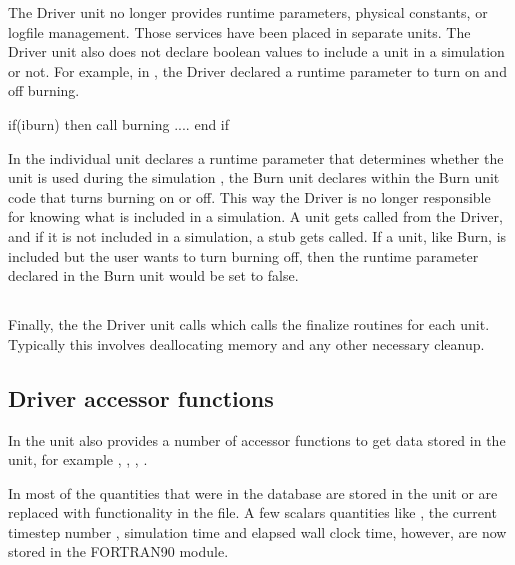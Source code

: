 \begin{flashtip}
The \unit{Driver} unit no longer provides runtime parameters,
physical constants, or logfile management.  Those services have been
placed in separate units.  The \unit{Driver} unit also does not declare
boolean values to include a unit in a simulation or not.  For example,
in \flashx, the \unit{Driver} declared a runtime parameter  to turn on and off
burning.
\begin{codeseg}
if(iburn) then
    call burning ....
end if
\end{codeseg}
 In \flashx the individual unit declares a runtime parameter that
 determines whether the unit is used during the simulation \eg, the \unit{Burn} unit declares
 within the \unit{Burn} unit code that
turns burning on or off.  This way the \unit{Driver} is no longer responsible for knowing what is included in a simulation.
A unit gets called from the \unit{Driver}, and if it is not included in a simulation, a stub gets called.
If a unit, like \unit{Burn}, is included but the user wants to turn burning off, then the runtime parameter
declared in the \unit{Burn} unit would be set to false.
\end{flashtip}


\subsection{}
Finally, the the \unit{Driver} unit calls  which calls the finalize routines for each unit.  Typically this involves deallocating memory and any other necessary cleanup.


\subsection{Driver accessor functions}
In \flashx the  unit also provides a number of
accessor functions to get data stored in the  unit, for
example ,  ,  
 ,  .

\begin{flashtip}
In \flashx most of the quantities that were in the \flashx database are stored in the
 unit or are replaced with functionality in the  file.  A few scalars
quantities like , the current timestep number , simulation time and elapsed
wall clock time, however, are now stored in the  FORTRAN90 module.
\end{flashtip}

